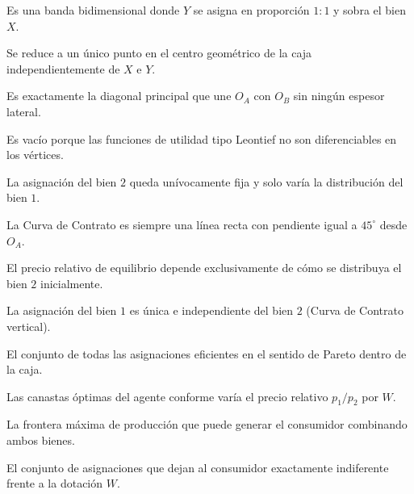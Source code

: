 \begin{opts}
    \item Es una banda bidimensional donde $Y$ se asigna en proporción $1:1$ y sobra el bien $X$.
    \item Se reduce a un único punto en el centro geométrico de la caja independientemente de $X$ e $Y$.
    \item Es exactamente la diagonal principal que une $O_A$ con $O_B$ sin ningún espesor lateral.
    \item Es vacío porque las funciones de utilidad tipo Leontief no son diferenciables en los vértices.
\end{opts}

\begin{opts}
    \item La asignación del bien $2$ queda unívocamente fija y solo varía la distribución del bien $1$.
    \item La Curva de Contrato es siempre una línea recta con pendiente igual a $45^\circ$ desde $O_A$.
    \item El precio relativo de equilibrio depende exclusivamente de cómo se distribuya el bien $2$ inicialmente.
    \item La asignación del bien $1$ es única e independiente del bien $2$ (Curva de Contrato vertical).
\end{opts}

\begin{opts}
    \item El conjunto de todas las asignaciones eficientes en el sentido de Pareto dentro de la caja.
    \item Las canastas óptimas del agente conforme varía el precio relativo $p_1 / p_2$ por $W$.
    \item La frontera máxima de producción que puede generar el consumidor combinando ambos bienes.
    \item El conjunto de asignaciones que dejan al consumidor exactamente indiferente frente a la dotación $W$.
\end{opts}

